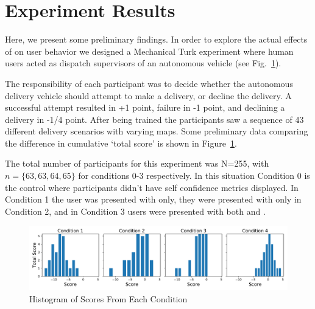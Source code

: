 \section{Experiment Results} \label{sec:exp_results}
Here, we present some preliminary findings. In order to explore the actual effects of \famsec{} on user behavior we designed a Mechanical Turk experiment where human users acted as dispatch supervisors of an autonomous vehicle (see Fig.~\ref{fig:experiment}). 

The responsibility of each participant was to decide whether the autonomous delivery vehicle should attempt to make a delivery, or decline the delivery. A successful attempt resulted in +1 point, failure in -1 point, and declining a delivery in -1/4 point. After being trained the participants saw a sequence of 43 different delivery scenarios with varying maps. Some preliminary data comparing the difference in cumulative `total score' is shown in Figure~\ref{fig:experiment}.

The total number of participants for this experiment was N=255, with $n=\{63,63,64,65\}$ for conditions 0-3 respectively. In this situation Condition 0 is the control where participants didn't have self confidence metrics displayed. In Condition 1 the user was presented with \xQ{} only, they were presented with \xP{} only in Condition 2, and in Condition 3 users were presented with both \xQ{} and \xP{}.

\begin{figure}[tbp]
    \centering
    \includegraphics[width=1.0\linewidth]{Figures/test.pdf}
    \caption{Histogram of Scores From Each Condition}
    \label{fig:experiment}
\end{figure}

